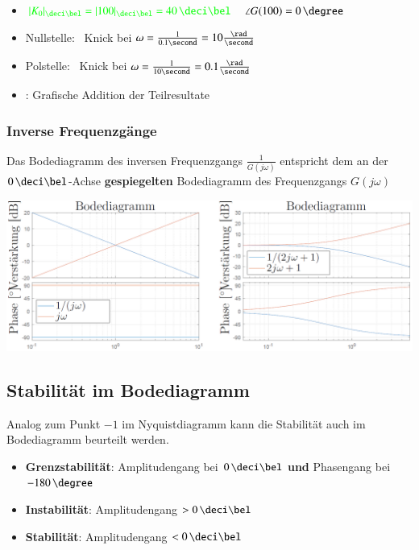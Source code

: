   \begin{itemize}
    \item $ \cgn{|K_0|_{\deci \bel} = |100|_{\deci \bel} = 40 \, \deci \bel}$ \textrightarrow\ $\angle G(100) = 0 \, \degree$
    \item Nullstelle:  \textrightarrow\ Knick bei $\omega = \frac{1}{0.1 \second} = 10 \frac{\rad}{\second}$
    \item Polstelle:  \textrightarrow\ Knick bei $\omega = \frac{1}{10 \second} = 0.1 \frac{\rad}{\second}$
    \item {}: Grafische Addition der Teilresultate
  \end{itemize}




\subsubsection{Inverse Frequenzgänge}

Das Bodediagramm des inversen Frequenzgangs $\frac{1}{G(j \omega)}$ entspricht dem an der $0 \, \deci \bel$-Achse 
\textbf{gespiegelten} Bodediagramm des Frequenzgangs $G(j \omega)$ 
\vspace{0.2cm}
 
\includegraphics[width=\columnwidth]{images/inverse_frequenzgaenge.png}


\subsection{Stabilität im Bodediagramm}
Analog zum Punkt $-1$ im Nyquistdiagramm kann die Stabilität auch im Bodediagramm beurteilt werden.

\begin{itemize}
    \item \textbf{Grenzstabilität}: Amplitudengang bei $0 \, \deci \bel$ \textbf{und} Phasengang bei $-180 \, \degree$
    \item \textbf{Instabilität}: Amplitudengang $>0 \, \deci \bel$
    \item \textbf{Stabilität}: Amplitudengang $<0 \, \deci \bel$
\end{itemize}


